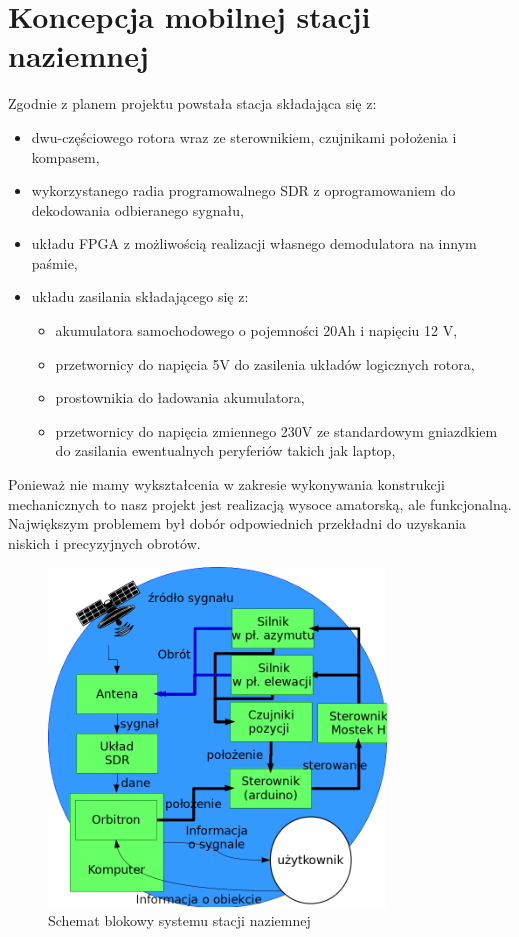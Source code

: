 \section{Koncepcja mobilnej stacji naziemnej}

Zgodnie z planem projektu powstała stacja składająca się z:

\begin{itemize}
 \item dwu-częściowego rotora wraz ze sterownikiem, czujnikami położenia i kompasem,
 \item wykorzystanego radia programowalnego SDR z oprogramowaniem do dekodowania odbieranego sygnału,
 \item układu FPGA z możliwością realizacji własnego demodulatora na innym paśmie,
 \item układu zasilania składającego się z: 
    \begin{itemize}
    \item akumulatora samochodowego o pojemności 20Ah i napięciu 12 V,
    \item przetwornicy do napięcia 5V do zasilenia układów logicznych rotora,
    \item prostownikia do ładowania akumulatora,
    \item przetwornicy do napięcia zmiennego 230V ze standardowym gniazdkiem do zasilania ewentualnych peryferiów takich jak laptop,
    \end{itemize}
\end{itemize}

Ponieważ nie mamy wykształcenia w zakresie wykonywania konstrukcji mechanicznych to nasz projekt jest realizacją wysoce amatorską, ale funkcjonalną. Największym problemem był dobór odpowiednich przekładni do uzyskania niskich i precyzyjnych obrotów.

\begin{figure}
    \centering
    \includegraphics[width=0.8\textwidth]{schemat_skik2017}
    \caption{Schemat blokowy systemu stacji naziemnej}
\end{figure}
